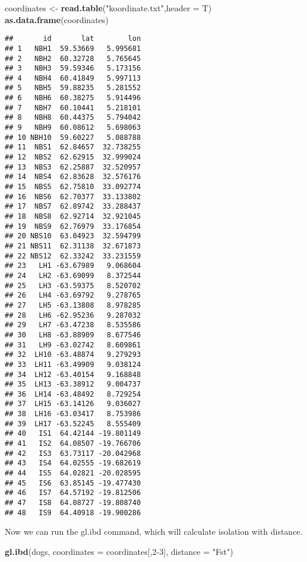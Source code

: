 \documentclass[
]{article}
\newenvironment{Shaded}{\begin{snugshade}}{\end{snugshade}}
\newcommand{\AttributeTok}[1]{\textcolor[rgb]{0.13,0.29,0.53}{#1}}
\newcommand{\DecValTok}[1]{\textcolor[rgb]{0.00,0.00,0.81}{#1}}
\newcommand{\FunctionTok}[1]{\textcolor[rgb]{0.13,0.29,0.53}{\textbf{#1}}}
\newcommand{\NormalTok}[1]{#1}
\newcommand{\OtherTok}[1]{\textcolor[rgb]{0.56,0.35,0.01}{#1}}
\newcommand{\StringTok}[1]{\textcolor[rgb]{0.31,0.60,0.02}{#1}}
\begin{document}
\begin{Shaded}
\begin{Highlighting}[]
\NormalTok{coordinates }\OtherTok{\textless{}{-}} \FunctionTok{read.table}\NormalTok{(}\StringTok{"koordinate.txt"}\NormalTok{,}\AttributeTok{header =}\NormalTok{ T)}
\FunctionTok{as.data.frame}\NormalTok{(coordinates)}
\end{Highlighting}
\end{Shaded}

\begin{verbatim}
##       id       lat        lon
## 1   NBH1  59.53669   5.995681
## 2   NBH2  60.32728   5.765645
## 3   NBH3  59.59346   5.173156
## 4   NBH4  60.41849   5.997113
## 5   NBH5  59.88235   5.281552
## 6   NBH6  60.38275   5.914496
## 7   NBH7  60.10441   5.218101
## 8   NBH8  60.44375   5.794042
## 9   NBH9  60.08612   5.698063
## 10 NBH10  59.60227   5.088788
## 11  NBS1  62.84657  32.738255
## 12  NBS2  62.62915  32.999024
## 13  NBS3  62.25887  32.520957
## 14  NBS4  62.83628  32.576176
## 15  NBS5  62.75810  33.092774
## 16  NBS6  62.70377  33.133802
## 17  NBS7  62.89742  33.288437
## 18  NBS8  62.92714  32.921045
## 19  NBS9  62.76979  33.176854
## 20 NBS10  63.04923  32.594799
## 21 NBS11  62.31138  32.671873
## 22 NBS12  62.33242  33.231559
## 23   LH1 -63.67989   9.068604
## 24   LH2 -63.69099   8.372544
## 25   LH3 -63.59375   8.520702
## 26   LH4 -63.69792   9.278765
## 27   LH5 -63.13808   8.978285
## 28   LH6 -62.95236   9.287032
## 29   LH7 -63.47238   8.535586
## 30   LH8 -63.88909   8.677546
## 31   LH9 -63.02742   8.609861
## 32  LH10 -63.48874   9.279293
## 33  LH11 -63.49909   9.038124
## 34  LH12 -63.40154   9.168848
## 35  LH13 -63.38912   9.004737
## 36  LH14 -63.48492   8.729254
## 37  LH15 -63.14126   9.036027
## 38  LH16 -63.03417   8.753986
## 39  LH17 -63.52245   8.555409
## 40   IS1  64.42144 -19.801149
## 41   IS2  64.08507 -19.766706
## 42   IS3  63.73117 -20.042968
## 43   IS4  64.02555 -19.682619
## 44   IS5  64.02821 -20.028595
## 45   IS6  63.85145 -19.477430
## 46   IS7  64.57192 -19.812506
## 47   IS8  64.08727 -19.808740
## 48   IS9  64.40918 -19.900286
\end{verbatim}

Now we can run the gl.ibd command, which will calculate isolation with
distance.

\begin{Shaded}
\begin{Highlighting}[]
\FunctionTok{gl.ibd}\NormalTok{(dogs, }\AttributeTok{coordinates =}\NormalTok{ coordinates[,}\DecValTok{2{-}3}\NormalTok{], }\AttributeTok{distance =} \StringTok{"Fst"}\NormalTok{)}
\end{Highlighting}
\end{Shaded}
\end{document}
